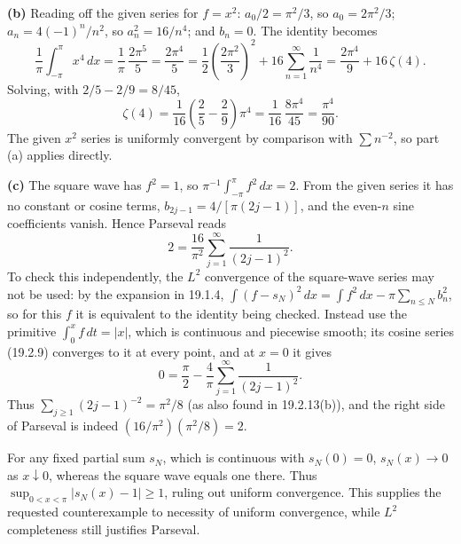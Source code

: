 \textbf{(b)} Reading off the given series for $f=x^2$:
$a_0/2=\pi^2/3$, so $a_0=2\pi^2/3$; $a_n=4(-1)^n/n^2$, so
$a_n^2=16/n^4$; and $b_n=0$. The identity becomes
\[
\frac1\pi\int_{-\pi}^{\pi}x^4\,dx
=\frac1\pi\,\frac{2\pi^5}5
=\frac{2\pi^4}{5}
=\frac12\left(\frac{2\pi^2}{3}\right)^2
 +16\sum_{n=1}^{\infty}\frac1{n^4}
=\frac{2\pi^4}9+16\,\zeta(4).
\]
Solving, with $2/5-2/9=8/45$,
\[
\boxed{\zeta(4)=\frac1{16}\left(\frac25-\frac29\right)\pi^4
=\frac1{16}\,\frac{8\pi^4}{45}=\frac{\pi^4}{90}.}
\]
The given $x^2$ series is uniformly convergent by comparison with
$\sum n^{-2}$, so part (a) applies directly.

\textbf{(c)} The square wave has $f^2=1$, so
$\pi^{-1}\int_{-\pi}^{\pi}f^2\,dx=2$. From the given series it has no
constant or cosine terms, $b_{2j-1}=4/[\pi(2j-1)]$, and the even-$n$
sine coefficients vanish. Hence Parseval reads
\[
2=\frac{16}{\pi^2}\sum_{j=1}^{\infty}\frac1{(2j-1)^2}.
\]
To check this independently, the $L^2$ convergence of the square-wave
series may not be used: by the expansion in 19.1.4,
$\int(f-s_N)^2\,dx=\int f^2\,dx-\pi\sum_{n\le N}b_n^2$, so for this $f$
it is equivalent to the identity being checked. Instead use the
primitive $\int_0^xf\,dt=|x|$, which is continuous and piecewise smooth;
its cosine series (19.2.9) converges to it at every point, and at $x=0$
it gives
\[
0=\frac\pi2-\frac4\pi\sum_{j=1}^{\infty}\frac1{(2j-1)^2}.
\]
Thus $\sum_{j\ge1}(2j-1)^{-2}=\pi^2/8$ (as also found in 19.2.13(b)),
and the right side of Parseval is indeed $(16/\pi^2)(\pi^2/8)=2$.

For any fixed partial sum $s_N$, which is continuous with $s_N(0)=0$,
$s_N(x)\to0$ as $x\downarrow0$, whereas the square wave equals one there. Thus
$\sup_{0<x<\pi}|s_N(x)-1|\ge1$, ruling out uniform convergence. This supplies the requested counterexample
to necessity of uniform convergence, while $L^2$ completeness still
justifies Parseval.

